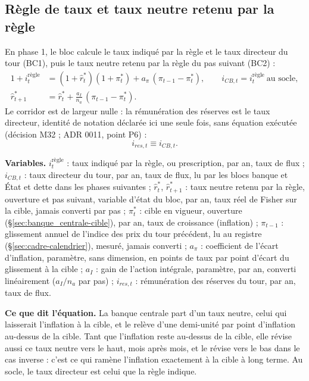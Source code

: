 \documentclass[11pt,a4paper]{article}
\newcommand{\variables}{\par\noindent\textbf{Variables.} }
\newcommand{\sens}{\par\noindent\textbf{Ce que dit l'équation.} }
\begin{document}
\subsection{Règle de taux et taux neutre retenu par la règle}
\label{sec:banque_centrale-regle}
\begin{proposee}
En phase 1, le bloc calcule le taux indiqué par la règle et le taux directeur du tour (BC1), puis le taux neutre retenu par la règle du pas suivant (BC2) :
\begin{align}
1 + i^{\text{règle}}_t &= (1 + \hat r^\ast_t)(1 + \pi^\ast_t) + a_\pi\,(\pi_{t-1} - \pi^\ast_t), \qquad i_{\mathit{CB},t} = i^{\text{règle}}_t \ \text{au socle} , \tag{BC1}\label{eq:banque_centrale-regle-taux} \\
\hat r^\ast_{t+1} &= \hat r^\ast_t + \frac{a_I}{n_a}\,(\pi_{t-1} - \pi^\ast_t) . \tag{BC2}\label{eq:banque_centrale-taux-neutre}
\end{align}
Le corridor est de largeur nulle : la rémunération des réserves est le taux directeur, identité de notation déclarée ici une seule fois, sans équation exécutée (décision M32 ; ADR 0011, point P6) :
\begin{equation*}
i_{\mathit{res},t} \equiv i_{\mathit{CB},t} .
\end{equation*}
\begin{lecture}
\variables $i^{\text{règle}}_t$ : taux indiqué par la règle, ou prescription, par an, taux de flux ; $i_{\mathit{CB},t}$ : taux directeur du tour, par an, taux de flux, lu par les blocs banque et État et dette dans les phases suivantes ; $\hat r^\ast_t$, $\hat r^\ast_{t+1}$ : taux neutre retenu par la règle, ouverture et pas suivant, variable d'état du bloc, par an, taux réel de Fisher sur la cible, jamais converti par pas ; $\pi^\ast_t$ : cible en vigueur, ouverture (\S\ref{sec:banque_centrale-cible}), par an, taux de croissance (inflation) ; $\pi_{t-1}$ : glissement annuel de l'indice des prix du tour précédent, lu au registre (\S\ref{sec:cadre-calendrier}), mesuré, jamais converti ; $a_\pi$ : coefficient de l'écart d'inflation, paramètre, sans dimension, en points de taux par point d'écart du glissement à la cible ; $a_I$ : gain de l'action intégrale, paramètre, par an, converti linéairement ($a_I/n_a$ par pas) ; $i_{\mathit{res},t}$ : rémunération des réserves du tour, par an, taux de flux.
\sens La banque centrale part d'un taux neutre, celui qui laisserait l'inflation à la cible, et le relève d'une demi-unité par point d'inflation au-dessus de la cible. Tant que l'inflation reste au-dessus de la cible, elle révise aussi ce taux neutre vers le haut, mois après mois, et le révise vers le bas dans le cas inverse : c'est ce qui ramène l'inflation exactement à la cible à long terme. Au socle, le taux directeur est celui que la règle indique.

\end{lecture}
\end{proposee}
\end{document}
